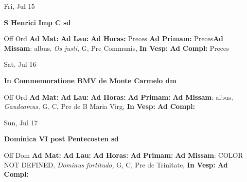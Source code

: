 \documentclass[10pt]{book}
\begin{document}
\begin{center}
\begin{minipage}{3.5in}
\vspace{2em}
\begin{center}Fri, Jul 15
\end{center}
\textbf{ \large S Henrici Imp C
\textnormal{\normalsize sd}}

\begin{justify}Off Ord
\textbf{Ad Mat: }
\textbf{Ad Lau: }
\textbf{Ad Horas: }Preces
\textbf{Ad Primam: }Preces\textbf{Ad Missam}: albus, \textit{Os justi,} G, Pre Communis, 
\textbf{In Vesp: }
\textbf{Ad Compl: }Preces
\end{justify}
\end{minipage}
\end{center}

\begin{center}
\begin{minipage}{3.5in}
\vspace{2em}
\begin{center}Sat, Jul 16
\end{center}
\textbf{ \large In Commemoratione BMV de Monte Carmelo
\textnormal{\normalsize dm}}

\begin{justify}Off Ord
\textbf{Ad Mat: }
\textbf{Ad Lau: }
\textbf{Ad Horas: }
\textbf{Ad Primam: }\textbf{Ad Missam}: albus, \textit{Gaudeamus,} G, C, Pre  de B Maria Virg, 
\textbf{In Vesp: }
\textbf{Ad Compl: }
\end{justify}
\end{minipage}
\end{center}

\begin{center}
\begin{minipage}{3.5in}
\vspace{2em}
\begin{center}Sun, Jul 17
\end{center}
\textbf{ \large Dominica VI post Pentecosten
\textnormal{\normalsize sd}}

\begin{justify}Off Dom
\textbf{Ad Mat: }
\textbf{Ad Lau: }
\textbf{Ad Horas: }
\textbf{Ad Primam: }\textbf{Ad Missam}: COLOR NOT DEFINED, \textit{Dominus fortitudo,} G, C, Pre de Trinitate, 
\textbf{In Vesp: }
\textbf{Ad Compl: }
\end{justify}
\end{minipage}
\end{center}
\end{document}
